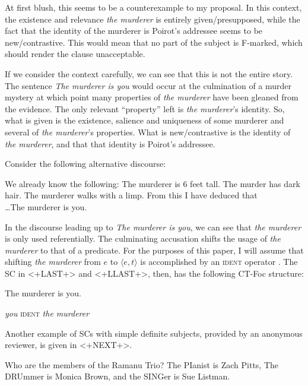 \documentclass[
	letterpaper,
]{article}
\begin{document}
At first blush, this seems to be a counterexample to my proposal.
In this context, the existence and relevance \textit{the murderer} is entirely given/presupposed, while the fact that the identity of the murderer is Poirot's addressee seems to be new/contrastive. 
This would mean that no part of the subject is F-marked, which should render the clause unacceptable.

If we consider the context carefully, we can see that this is not the entire story.
The sentence \textit{The murderer is you} would occur at the culmination of a murder mystery at which point many properties of \textit{the murderer} have been gleaned from the evidence.
The only relevant ``property'' left is \textit{the murderer}'s identity.
So, what is given is the existence, salience and uniqueness of  some murderer and several of \textit{the murderer}'s properties.
What is new/contrastive is the identity of \textit{the murderer}, and that that identity is Poirot's addressee.

Consider the following alternative discourse:
\begin{exe}
	\ex We already know the following: The murderer is 6 feet tall. The murder has dark hair. The murderer walks with a limp. From this I have deduced that \\
\ldots The murderer is you.
\end{exe}

In the discourse leading up to \textit{The murderer is you}, we can see that \textit{the murderer} is only used referentially.
The culminating accusation shifts the usage of \textit{the murderer} to that of a predicate.
For the purposes of this paper, I will assume that shifting \textit{the murderer} from $e$ to $\langle e, t\rangle$ is accomplished by an \textsc{ident} operator \parencite[cf.][]{partee1987noun}.
The SC in <+LAST+> and <+LLAST+>, then, has the following CT-Foc structure:
\begin{exe}
\ex The murderer is you.
\begin{xlist}
 \textit{you}
 \textsc{ident}
 \textit{the murderer}	
\end{xlist}	
\end{exe}
Another example of SCs with simple definite subjects, provided by an anonymous reviewer, is given in <+NEXT+>.
\begin{exe}
\ex
\begin{xlist}
	 Who are the members of the Ramanu Trio?
	 The PIanist is Zach Pitts, The DRUmmer is Monica Brown, and the SINGer is Sue Listman.
\end{xlist}	
\end{exe}
\end{document}
